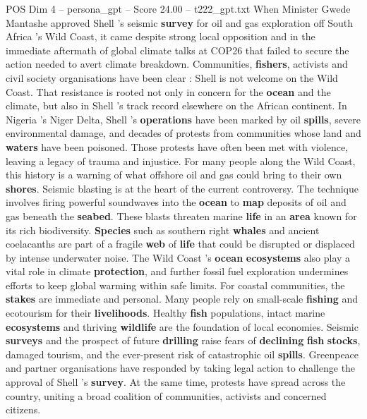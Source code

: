 \begin{textsample}{POS Dim 4 – persona\_gpt – Score 24.00 – t222\_gpt.txt}  \label{ex:f4_pos_029}
When Minister Gwede Mantashe approved Shell ’s seismic \textbf{survey} for oil and gas exploration off South Africa ’s Wild Coast, it came despite strong local opposition and in the immediate aftermath of global climate talks at COP26 that failed to secure the action needed to avert climate breakdown.
Communities, \textbf{fishers}, activists and civil society organisations have been clear : Shell is not welcome on the Wild Coast.
That resistance is rooted not only in concern for the \textbf{ocean} and the climate, but also in Shell ’s track record elsewhere on the African continent.
In Nigeria ’s Niger Delta, Shell ’s \textbf{operations} have been marked by oil \textbf{spills}, severe environmental damage, and decades of protests from communities whose land and \textbf{waters} have been poisoned.
Those protests have often been met with violence, leaving a legacy of trauma and injustice.
For many people along the Wild Coast, this history is a warning of what offshore oil and gas could bring to their own \textbf{shores}.
Seismic blasting is at the heart of the current controversy.
The technique involves firing powerful soundwaves into the \textbf{ocean} to \textbf{map} deposits of oil and gas beneath the \textbf{seabed}.
These blasts threaten marine \textbf{life} in an \textbf{area} known for its rich biodiversity. \textbf{Species} such as southern right \textbf{whales} and ancient coelacanths are part of a fragile \textbf{web} of \textbf{life} that could be disrupted or displaced by intense underwater noise.
The Wild Coast ’s \textbf{ocean} \textbf{ecosystems} also play a vital role in climate \textbf{protection}, and further fossil fuel exploration undermines efforts to keep global warming within safe limits.
For coastal communities, the \textbf{stakes} are immediate and personal.
Many people rely on small-scale \textbf{fishing} and ecotourism for their \textbf{livelihoods}.
Healthy \textbf{fish} populations, intact marine \textbf{ecosystems} and thriving \textbf{wildlife} are the foundation of local economies.
Seismic \textbf{surveys} and the prospect of future \textbf{drilling} raise fears of \textbf{declining} \textbf{fish} \textbf{stocks}, damaged tourism, and the ever-present risk of catastrophic oil \textbf{spills}.
Greenpeace and partner organisations have responded by taking legal action to challenge the approval of Shell ’s \textbf{survey}.
At the same time, protests have spread across the country, uniting a broad coalition of communities, activists and concerned citizens.

\end{textsample}
